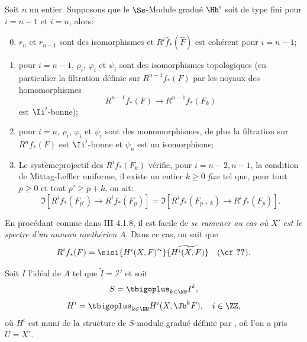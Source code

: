 \begin{theoreme} \label{IX.1.1} \setcounter{equation}{11}
Soit $n$ un entier. Supposons que le $\Ss$-Module gradu\'e $\Hh^i$ soit de type fini pour $i=n-1$ et $i=n$, alors:
\begin{enumerate}\setcounter{enumi}{-1}
\item
$r_n$ et $r_{n-1}$ sont des isomorphismes et $R^i\hat{f}_*(\hat{F})$ est coh\'erent pour $i=n-1$;
\item
pour $i=n-1$, $\rho_i$, $\varphi_i$ et $\psi_i$ sont des isomorphismes topologiques (en particulier la filtration d\'efinie sur $R^{n-1}f_*(F)$ par les noyaux des homomorphismes
\begin{equation} \label{eq:IX.1.12}
R^{n-1}f_*(F) \to R^{n-1}f_*(F_k)
\end{equation}
est $\Ii'$-bonne);

\item
pour $i=n$, $\rho_i$, $\varphi_i$ et $\psi_i$ sont des monomorphismes, de plus la filtration sur $R^n f_*(F)$ est $\Ii'$-bonne et $\psi_n$ est un isomorphisme;

\item
Le syst\`eme\pageoriginale projectif des $R^i f_*(F_k)$ v\'erifie, pour $i=n-2, n-1$, la condition de Mittag-Leffler uniforme, \ie il existe un entier $k\geq 0$ \emph{fixe} tel que, pour tout $p\geq 0$ et tout $p'\geq p+k$, on ait:
\begin{equation*}
\Im[R^i f_*(F_{p'})\to R^i f_*(F_p)]=\Im[R^i f_*(F_{p+k})\to R^i f_*(F_p)].
\end{equation*}
\end{enumerate}
\end{theoreme}

En proc\'edant comme dans \EGA III 4.1.8, il est facile de \emph{se ramener au cas o\`u} $X'$ \emph{est le spectre d'un anneau noeth\'erien} $A$. Dans ce cas, on sait que
\begin{equation} \label{eq:IX.1.13} R^if_*(F)=\sisi{H^i(X, F)^\thicksim}{\widetilde{H^i(X, F)}} \quad \text{(\cf \Ref{eq:IX.1.10}).}
\end{equation}

Soit $I$ l'id\'eal de $A$ tel que $\tilde{I}=\mathcal I'$ et soit
\begin{equation} \label{eq:IX.1.14}
S=\tbigoplus_{k \in \NN}I^k,
\end{equation}
\begin{equation} \label{eq:IX.1.15}
H^i=\tbigoplus_{k \in \NN}H^i(X, {\Jb}^k F), \quad i \in \ZZ,
\end{equation}
o\`u $H^i$ est muni de la structure de $S$-module gradu\'e d\'efinie par , o\`u l'on a pris $U=X'$.

